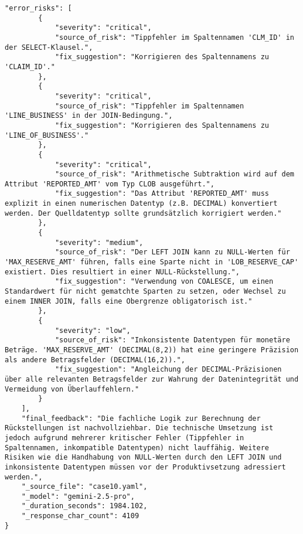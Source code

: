 \begin{lstlisting}[caption={Ausgabe: Gemini 2.5 Pro Anwendungsfall 10 Konsistenzdurchlauf},label={gemini_case10_prompt2}]
    "error_risks": [
        {
            "severity": "critical",
            "source_of_risk": "Tippfehler im Spaltennamen 'CLM_ID' in der SELECT-Klausel.",
            "fix_suggestion": "Korrigieren des Spaltennamens zu 'CLAIM_ID'."
        },
        {
            "severity": "critical",
            "source_of_risk": "Tippfehler im Spaltennamen 'LINE_BUSINESS' in der JOIN-Bedingung.",
            "fix_suggestion": "Korrigieren des Spaltennamens zu 'LINE_OF_BUSINESS'."
        },
        {
            "severity": "critical",
            "source_of_risk": "Arithmetische Subtraktion wird auf dem Attribut 'REPORTED_AMT' vom Typ CLOB ausgeführt.",
            "fix_suggestion": "Das Attribut 'REPORTED_AMT' muss explizit in einen numerischen Datentyp (z.B. DECIMAL) konvertiert werden. Der Quelldatentyp sollte grundsätzlich korrigiert werden."
        },
        {
            "severity": "medium",
            "source_of_risk": "Der LEFT JOIN kann zu NULL-Werten für 'MAX_RESERVE_AMT' führen, falls eine Sparte nicht in 'LOB_RESERVE_CAP' existiert. Dies resultiert in einer NULL-Rückstellung.",
            "fix_suggestion": "Verwendung von COALESCE, um einen Standardwert für nicht gematchte Sparten zu setzen, oder Wechsel zu einem INNER JOIN, falls eine Obergrenze obligatorisch ist."
        },
        {
            "severity": "low",
            "source_of_risk": "Inkonsistente Datentypen für monetäre Beträge. 'MAX_RESERVE_AMT' (DECIMAL(8,2)) hat eine geringere Präzision als andere Betragsfelder (DECIMAL(16,2)).",
            "fix_suggestion": "Angleichung der DECIMAL-Präzisionen über alle relevanten Betragsfelder zur Wahrung der Datenintegrität und Vermeidung von Überlauffehlern."
        }
    ],
    "final_feedback": "Die fachliche Logik zur Berechnung der Rückstellungen ist nachvollziehbar. Die technische Umsetzung ist jedoch aufgrund mehrerer kritischer Fehler (Tippfehler in Spaltennamen, inkompatible Datentypen) nicht lauffähig. Weitere Risiken wie die Handhabung von NULL-Werten durch den LEFT JOIN und inkonsistente Datentypen müssen vor der Produktivsetzung adressiert werden.",
    "_source_file": "case10.yaml",
    "_model": "gemini-2.5-pro",
    "_duration_seconds": 1984.102,
    "_response_char_count": 4109
}
\end{lstlisting}

